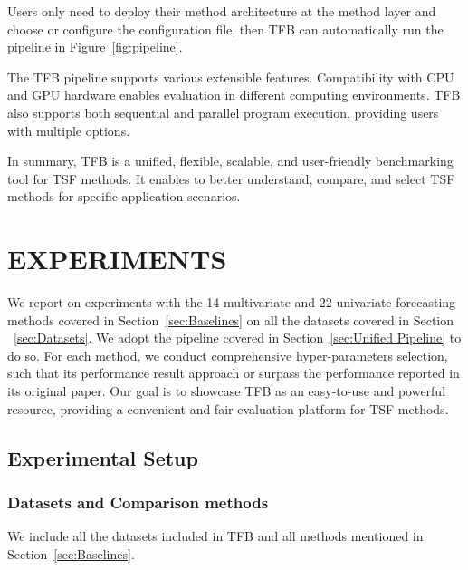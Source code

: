 \documentclass[sigconf, nonacm, pdfa]{acmart}
\begin{document}
Users only need to deploy their method architecture at the method layer and choose or configure the configuration file, then TFB can automatically run the pipeline in Figure~\ref{fig:pipeline}.

The TFB pipeline supports various extensible features. Compatibility with CPU and GPU hardware enables evaluation in different computing environments. TFB also supports both sequential and parallel program execution, providing users with multiple options.


In summary, TFB is a unified, flexible, scalable, and user-friendly benchmarking tool for TSF methods. It enables to better understand, compare, and select TSF methods for specific application scenarios.









\section{EXPERIMENTS}
\label{sec:EXPERIMENTS}


We report on experiments with the 14 multivariate and 22 univariate forecasting methods covered in Section~\ref{sec:Baselines} on all the datasets covered in Section ~\ref{sec:Datasets}. We adopt the pipeline covered in Section~\ref{sec:Unified Pipeline} to do so. For each method, we conduct comprehensive hyper-parameters selection, such that its performance result approach or surpass the performance reported in its original paper. Our goal is to showcase TFB as an easy-to-use and powerful resource, providing a convenient and fair evaluation platform for TSF methods. 



\subsection{Experimental Setup}


\subsubsection{Datasets and Comparison methods} We include all the datasets included in TFB and all methods mentioned in Section~\ref{sec:Baselines}. 
\end{document}
